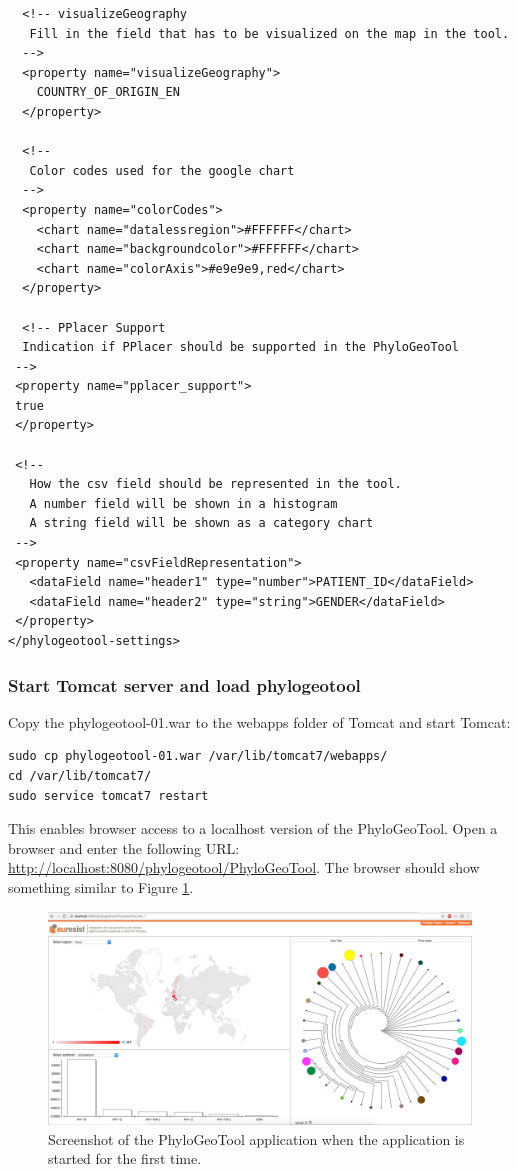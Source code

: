 \documentclass[a4paper, 11pt]{article} %
\begin{document}
\begin{verbatim}
  <!-- visualizeGeography 
   Fill in the field that has to be visualized on the map in the tool.
  -->
  <property name="visualizeGeography">
  	COUNTRY_OF_ORIGIN_EN
  </property>

  <!-- 
   Color codes used for the google chart
  -->
  <property name="colorCodes">
    <chart name="datalessregion">#FFFFFF</chart>
    <chart name="backgroundcolor">#FFFFFF</chart>    
    <chart name="colorAxis">#e9e9e9,red</chart>
  </property>
  
  <!-- PPlacer Support
  Indication if PPlacer should be supported in the PhyloGeoTool
 -->
 <property name="pplacer_support">
 true
 </property>

 <!--
   How the csv field should be represented in the tool.
   A number field will be shown in a histogram
   A string field will be shown as a category chart
 -->
 <property name="csvFieldRepresentation">
   <dataField name="header1" type="number">PATIENT_ID</dataField>
   <dataField name="header2" type="string">GENDER</dataField>
 </property>
</phylogeotool-settings>
\end{verbatim}



\subsubsection{Start Tomcat server and load phylogeotool}

Copy the phylogeotool-01.war to the webapps folder of Tomcat and start Tomcat:
\begin{verbatim}
sudo cp phylogeotool-01.war /var/lib/tomcat7/webapps/
cd /var/lib/tomcat7/
sudo service tomcat7 restart
\end{verbatim}
This enables browser access to a localhost version of the PhyloGeoTool.
Open a browser and enter the following URL: \url{http://localhost:8080/phylogeotool/PhyloGeoTool}.
The browser should show something similar to Figure \ref{fig:01}.


\begin{figure}[!htbp]
\includegraphics[scale=0.19]{images/defaultScreenshot.png}
\caption{Screenshot of the PhyloGeoTool application when the application is started for the first time.}
\label{fig:01} 
\end{figure}
\end{document}

